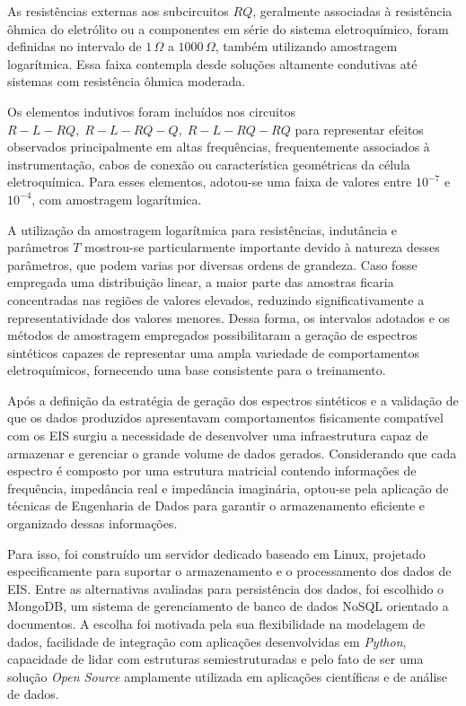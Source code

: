 As
resistências externas aos subcircuitos $RQ$, geralmente associadas à resistência ôhmica do
eletrólito ou a componentes em série do sistema eletroquímico, foram definidas no intervalo de
$1\,\Omega$ a $1000\,\Omega$, também utilizando amostragem logarítmica. Essa faixa contempla desde soluções altamente condutivas até sistemas com resistência ôhmica moderada.

Os elementos indutivos
foram incluídos nos circuitos $R-L-RQ,\; R-L-RQ-Q,\; R-L-RQ-RQ$ para
representar efeitos observados principalmente em altas frequências, frequentemente associados
à instrumentação, cabos de conexão ou característica geométricas da célula eletroquímica. Para esses elementos, adotou-se uma faixa de valores entre \(10^{-7}\) e \(10^{-4}\), com amostragem
logarítmica.

A utilização da amostragem logarítmica para resistências, indutância e parâmetros
$T$ mostrou-se particularmente importante devido à natureza desses parâmetros, que podem
varias por diversas ordens de grandeza. Caso fosse empregada uma distribuição linear, a maior
parte das amostras ficaria concentradas nas regiões de valores elevados, reduzindo
significativamente a representatividade dos valores menores. Dessa forma, os intervalos
adotados e os métodos de amostragem empregados possibilitaram a geração de espectros
sintéticos capazes de representar uma ampla variedade de comportamentos eletroquímicos,
fornecendo uma base consistente para o treinamento.

Após a definição da estratégia de geração dos espectros sintéticos e a validação de
que os dados produzidos apresentavam comportamentos fisicamente compatível com os EIS surgiu a necessidade de desenvolver uma infraestrutura capaz de armazenar e gerenciar o grande volume de dados gerados. Considerando que cada espectro é composto por uma
estrutura matricial contendo informações de frequência, impedância real e impedância
imaginária, optou-se pela aplicação de técnicas de Engenharia de Dados para garantir o
armazenamento eficiente e organizado dessas informações.

Para isso, foi construído um
servidor dedicado baseado em Linux, projetado especificamente para suportar o
armazenamento e o processamento dos dados de EIS. Entre as alternativas avaliadas para
persistência dos dados, foi escolhido o MongoDB, um sistema de gerenciamento de banco de
dados NoSQL orientado a documentos. A escolha foi motivada pela sua flexibilidade na
modelagem de dados, facilidade de integração com aplicações desenvolvidas em \textit{Python},
capacidade de lidar com estruturas semiestruturadas e pelo fato de ser uma solução \textit{Open Source}
amplamente utilizada em aplicações científicas e de análise de dados.


